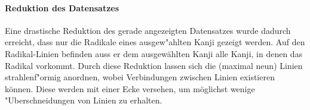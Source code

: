 \paragraph{Reduktion des Datensatzes}
Eine drastische Reduktion des gerade angezeigten Datensatzes wurde dadurch erreicht, dass nur die Radikale eines ausgew"ahlten Kanji gezeigt werden. Auf den Radikal-Linien befinden auss er dem ausgewählten Kanji alle Kanji, in denen das Radikal vorkommt. Durch diese Reduktion lassen sich die (maximal neun) Linien strahlenf"ormig anordnen, wobei Verbindungen zwischen Linien existieren können. Diese werden mit einer Ecke versehen, um möglichst wenige "Uberschneidungen von Linien zu erhalten. 

